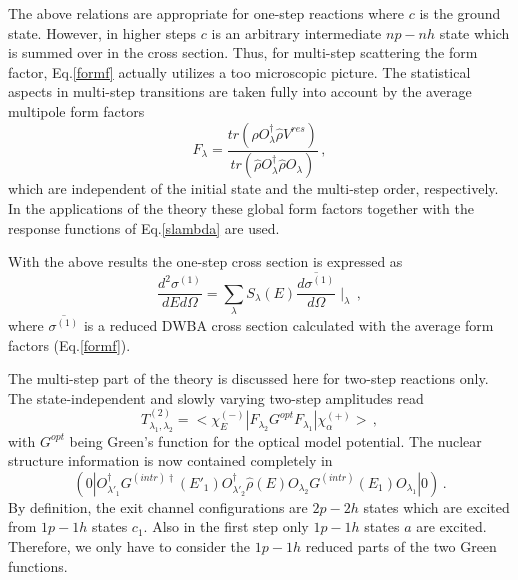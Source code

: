 \documentclass[twocolumn,amsmath,amssymb,10pt,groupedaddress,letter]{revtex4}
\begin{document}
The above relations are appropriate for one-step reactions where $c$
is the ground state. However, in higher steps $c$ is an arbitrary
intermediate $np-nh$ state which is summed over in the cross section.
Thus, for multi-step scattering the form factor, Eq.\ref{formf} actually
utilizes a too microscopic picture. The statistical aspects in multi-step
transitions are taken fully into account by the average multipole
form factors
\begin{equation}
F_{\lambda}=\frac{tr(\hat{\rho}O_{\lambda}^{\dag}\hat{\rho}V^{res})}{tr(\hat{\rho}O_{\lambda}^{\dag}\hat{\rho}O_{\lambda})}\,,\label{fav}
\end{equation}
\noindent which are independent of the initial state and the multi-step order,
respectively. In the applications of the theory these global form
factors together with the response functions of Eq.\ref{slambda}
are used.

With the above results the one-step cross section is expressed as
\begin{equation}
\frac{d^{2}\sigma^{(1)}}{dEd\Omega}=\sum_{\lambda}{S_{\lambda}(E)\overline{\frac{d\sigma^{(1)}}{d\Omega}}\mid_{\lambda}}\,,\label{sigma1}
\end{equation}
\noindent where $\overline{\sigma^{(1)}}$ is a reduced DWBA cross
section calculated with the average form factors (Eq.\ref{formf}).

The multi-step part of the theory is discussed here for two-step reactions
only. The state-independent and slowly varying two-step amplitudes
read
\begin{equation}
T_{\lambda_{1},\lambda_{2}}^{(2)}=<\chi_{E}^{(-)}|F_{\lambda_{2}}G^{opt}F_{\lambda_{1}}|\chi_{\alpha}^{(+)}>\,,\label{amp2}
\end{equation}
\noindent with $G^{opt}$ being Green's function for the optical model potential.
The nuclear structure information is now contained completely in
\begin{equation}
(0|O_{\lambda'_{1}}^{\dag}G^{(intr)\dag}(E'_{1})O_{\lambda'_{2}}^{\dag}\hat{\rho}(E)O_{\lambda_{2}}G^{(intr)}(E_{1})O_{\lambda_{1}}|0)\,.\label{two1}
\end{equation}
\noindent By definition, the exit channel configurations are $2p-2h$ states
which are excited from $1p-1h$ states $c_{1}$. Also in the first
step only $1p-1h$ states $a$ are excited. Therefore, we only have
to consider the $1p-1h$ reduced parts of the two Green functions.
\end{document}

